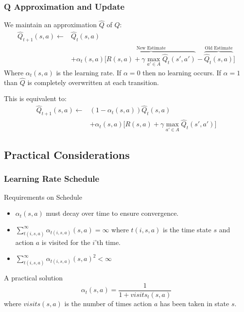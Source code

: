 \documentclass[ignorenonframetext]{beamer}
\begin{document}
\begin{frame}
	\frametitle{Q Approximation and Update}
	We maintain an approximation $\hat{Q}$ of $Q$:
	\begin{align*}
		\hat{Q}_{t+1}(s,a) \leftarrow & \hat{Q}_t(s,a) \\
		& + \alpha_t(s,a)\big[ \overbrace{R(s,a) + \gamma \max_{a' \in A}
		\hat{Q}_t(s',a')}^\text{New Estimate} -
		\overbrace{\hat{Q}_t(s,a)}^\text{Old Estimate} \big]
	\end{align*}
	Where $\alpha_t(s,a)$ is the learning rate.  
	If $\alpha = 0$ then no learning occurs.  If $\alpha = 1$ than
	$\hat{Q}$ is completely overwritten at each transition.

	\pause
	This is equivalent to:
	\begin{align*}
		\hat{Q}_{t+1}(s,a) \leftarrow & (1-\alpha_t(s,a))\hat{Q}_{t}(s,a) \\
		& + \alpha_t(s,a)\big[ R(s,a) + \gamma \max_{a' \in A}
		\hat{Q}_t(s',a') \big]
	\end{align*}
\end{frame}

\subsection{Practical Considerations}

\begin{frame}
	\frametitle{Learning Rate Schedule}
	\begin{block}{Requirements on Schedule}
		\begin{itemize}
			\item $\alpha_t(s,a)$ must decay over time to ensure convergence.
				\pause
			\item $\sum_{t(i,s,a)}^{\infty} \alpha_{t(i,s,a)}(s,a) = \infty$
				where $t(i,s,a)$ is the time state $s$ and action $a$ is visited
				for the $i$'th time.
				\pause
			\item $\sum_{t(i,s,a)}^{\infty} \alpha_{t(i,s,a)}(s,a)^2 < \infty$ 
				\pause
		\end{itemize}
	\end{block}
	\begin{block}{A practical solution}
		\[
		\alpha_t(s,a) = \frac{1}{1 + visits_t(s,a)}
		\]
		where $visits(s,a)$ is the number of times action $a$ has been
		taken in state $s$.
	\end{block}
\end{frame}
\end{document}
